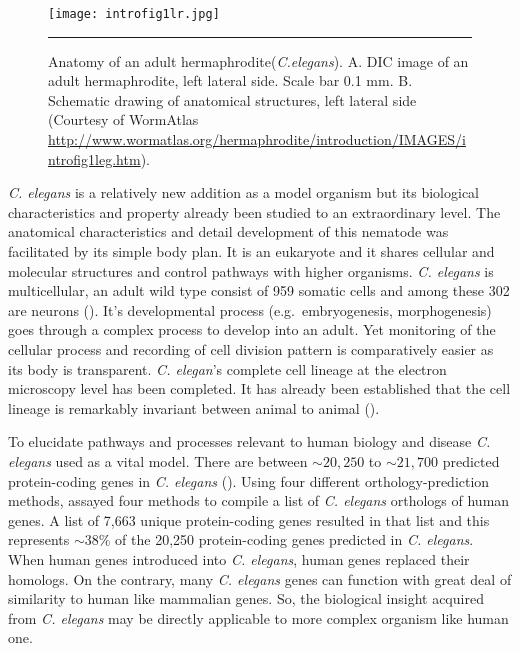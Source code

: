 \begin{figure}%
	\centering
		\texttt{[image: introfig1lr.jpg]}
		\rule{35em}{0.5pt}
	\caption[Anatomy of an adult \textit{C.elegans}]{Anatomy of an adult hermaphrodite(\textit{C.elegans}). 
	A. DIC image of an adult hermaphrodite, left lateral side. Scale bar 0.1 mm. 
	B. Schematic drawing of anatomical structures, left lateral side 
	(Courtesy of WormAtlas \url{http://www.wormatlas.org/hermaphrodite/introduction/IMAGES/introfig1leg.htm}).}
	\label{fig:anatomy}
\end{figure}

\textit{C. elegans} is a relatively new addition as a model organism but its biological characteristics and property already been studied to an extraordinary level. The anatomical characteristics and detail development of this nematode was facilitated by its simple body plan. It is an eukaryote and it shares cellular and molecular structures and control pathways with higher organisms. \textit{C. elegans}
is multicellular, an adult wild type  consist of 959 somatic cells and among these 302 are neurons (\cite{Sulston:1977, Palikaras:2013}). It's developmental process (e.g.\ embryogenesis, morphogenesis) goes through a complex process to develop into an adult. Yet monitoring of the cellular process  and recording of cell division pattern is comparatively easier as its body is transparent. \textit{C. elegan}'s complete cell lineage at the electron microscopy level has been completed. It has already been established that the cell lineage is remarkably invariant between animal to animal (\cite{Brenner:1974, Byerly:1976, Sulston:1980, Wood:1988}).

To elucidate pathways and processes relevant to human biology and disease \textit{C. elegans} used as a vital model. There are between $\sim20,250$ to $\sim21,700$ predicted protein-coding genes in \textit{C. elegans} (\cite{Gerstein:2010}). Using four different orthology-prediction methods,  \cite{Shaye:2011} assayed four methods to compile a list of \textit{C. elegans} orthologs of human genes. A  list of 7,663 unique protein-coding genes resulted in that list and this represents $\sim38\%$ of the 20,250 protein-coding genes predicted in \textit{C. elegans}. When human genes introduced into \textit{C. elegans}, human genes replaced their homologs. On the contrary, many \textit{C. elegans} genes can function with great deal of similarity to human like mammalian genes. So, the biological insight acquired from \textit{C. elegans} may be directly applicable to more complex organism like human one.

